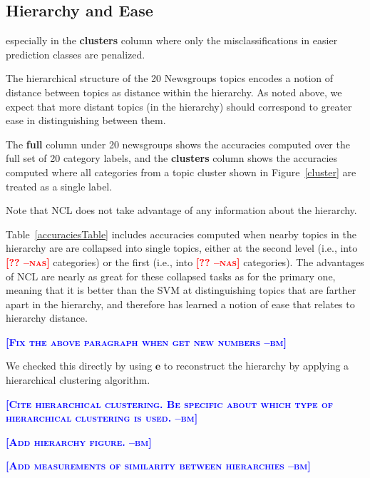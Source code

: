 \documentclass{article} %
\newcommand{\ourmethod}{NCL}
\newcommand{\bmcomment}[1]{\textcolor{blue}{\textsc{\textbf{[#1 --bm]}}}}
\newcommand{\nascomment}[1]{\textcolor{red}{\textsc{\textbf{[#1 --nas]}}}}
\begin{document}
\subsection{Hierarchy and Ease}

especially in the \textbf{clusters} column
where only the misclassifications in easier prediction classes are
penalized.

The hierarchical structure of the 20 Newsgroups topics encodes a notion
of distance between topics as distance within the hierarchy.  
As
noted above, we expect that more distant topics (in the hierarchy)
should correspond to greater ease in distinguishing between them.

The \textbf{full} column under 20 newsgroups shows the 
accuracies computed over the full set of 20 category labels,
and the \textbf{clusters} column shows the accuracies computed
where all categories from a topic cluster shown in
Figure~\ref{cluster} are treated as a single label.

Note that \ourmethod{} does not take advantage of any information
about the hierarchy.

Table~\ref{accuraciesTable} includes accuracies 
computed when nearby topics in the hierarchy are are collapsed into
single topics, either at the second level (i.e., into \nascomment{??}
categories) or the first (i.e., into \nascomment{??} categories).
The advantages of \ourmethod{} are nearly as great for these collapsed
tasks as for the primary one, meaning that it is better than the SVM
at distinguishing topics that are farther apart in the hierarchy, and
therefore has learned a notion of ease that relates to hierarchy
distance.


\bmcomment{Fix the above paragraph when get new numbers}

We checked this directly by using $\mathbf{e}$ to reconstruct the
hierarchy by applying a hierarchical clustering algorithm. 

\bmcomment{Cite hierarchical clustering.  Be specific about which
type of hierarchical clustering is used.}

\bmcomment{Add hierarchy figure.}


\bmcomment{Add measurements of similarity between hierarchies}

\end{document}
